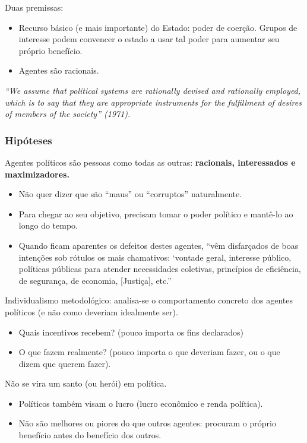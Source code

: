 \documentclass[a4paper,12pt]{article}[abntex2]
\begin{document}
Duas premissas:\begin{itemize}
    \item Recurso básico (e mais importante) do Estado: poder de coerção. Grupos de interesse podem convencer o estado a usar tal poder para aumentar seu próprio benefício.
    \item Agentes são racionais.
\end{itemize}

\textit{“We assume that political systems are rationally devised and rationally employed, which is to say that they are appropriate instruments for the fulfillment of desires of members of the society” (1971).}

\subsubsection{\textbf{Hipóteses}}
Agentes políticos são pessoas como todas as outras: \textbf{racionais, interessados e maximizadores.}\begin{itemize}
    \item Não quer dizer que são “maus” ou “corruptos” naturalmente. 
    \item Para chegar ao seu objetivo, precisam tomar o poder político e mantê-lo ao longo do tempo.
    \item Quando ficam aparentes os defeitos destes agentes, “vêm disfarçados de boas intenções sob rótulos os mais chamativos: ‘vontade geral, interesse público, políticas públicas para atender necessidades coletivas, princípios de eficiência, de segurança, de economia, [Justiça], etc.”
\end{itemize}

Individualismo metodológico: analisa-se o comportamento concreto dos agentes políticos (e não como deveriam idealmente ser).\begin{itemize}
    \item Quais incentivos recebem? (pouco importa os fins declarados)
    \item O que fazem realmente? (pouco importa o que deveriam fazer, ou o que dizem que querem fazer).
\end{itemize}

Não se vira um santo (ou herói) em política.\begin{itemize}
    \item Políticos também visam o lucro (lucro econômico e renda política). 
    \item Não são melhores ou piores do que outros agentes: procuram o próprio benefício antes do benefício dos outros. 
\end{itemize}
\end{document}

